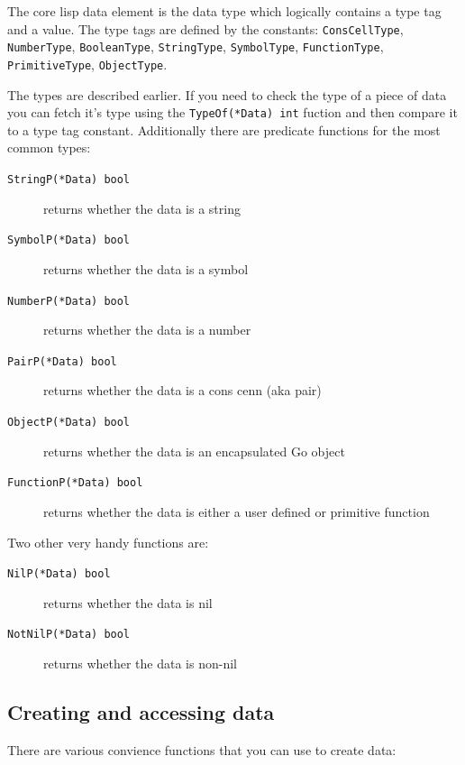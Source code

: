 \documentclass[12pt]{article}
\begin{document}
The core lisp data element is the data type which logically
contains a type tag and a value. The type tags are defined by the
constants: \verb|ConsCellType|, \verb|NumberType|, \verb|BooleanType|,
\verb|StringType|, \verb|SymbolType|, \verb|FunctionType|,
\verb|PrimitiveType|, \verb|ObjectType|.

\noindent The types are described earlier. If you need to check the
type of a piece of data you can fetch it's type using the
\verb|TypeOf(*Data) int| fuction and then compare it to a type tag
constant. Additionally there are predicate functions for the most
common types: 

\begin{description}
\item [{\tt StringP(*Data) bool}] returns whether the data is a string
\item [{\tt SymbolP(*Data) bool}] returns whether the data is a symbol
\item [{\tt NumberP(*Data) bool}] returns whether the data is a number
\item [{\tt PairP(*Data) bool}] returns whether the data is a cons cenn
  (aka pair)
\item [{\tt ObjectP(*Data) bool}] returns whether the data is an
  encapsulated Go object 
\item [{\tt FunctionP(*Data) bool}] returns whether the data is either
  a user defined or primitive function
\end{description}

\noindent Two other very handy functions are:

\begin{description}
\item [{\tt NilP(*Data) bool}] returns whether the data is nil
\item [{\tt NotNilP(*Data) bool}] returns whether the data is non-nil
\end{description}

\subsection{Creating and accessing data}

There are various convience functions that you can use to create data:
\end{document}

